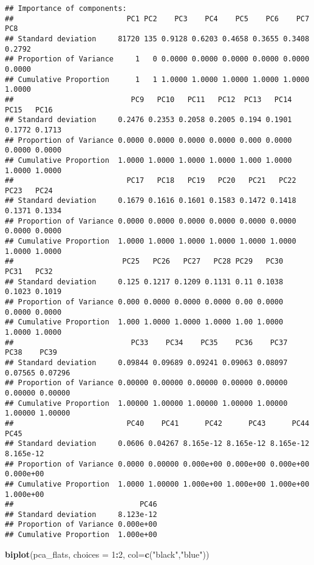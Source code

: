 \documentclass[
]{article}
\newenvironment{Shaded}{\begin{snugshade}}{\end{snugshade}}
\newcommand{\DataTypeTok}[1]{\textcolor[rgb]{0.13,0.29,0.53}{#1}}
\newcommand{\DecValTok}[1]{\textcolor[rgb]{0.00,0.00,0.81}{#1}}
\newcommand{\KeywordTok}[1]{\textcolor[rgb]{0.13,0.29,0.53}{\textbf{#1}}}
\newcommand{\NormalTok}[1]{#1}
\newcommand{\OperatorTok}[1]{\textcolor[rgb]{0.81,0.36,0.00}{\textbf{#1}}}
\newcommand{\StringTok}[1]{\textcolor[rgb]{0.31,0.60,0.02}{#1}}
\begin{document}
\begin{verbatim}
## Importance of components:
##                          PC1 PC2    PC3    PC4    PC5    PC6    PC7    PC8
## Standard deviation     81720 135 0.9128 0.6203 0.4658 0.3655 0.3408 0.2792
## Proportion of Variance     1   0 0.0000 0.0000 0.0000 0.0000 0.0000 0.0000
## Cumulative Proportion      1   1 1.0000 1.0000 1.0000 1.0000 1.0000 1.0000
##                           PC9   PC10   PC11   PC12  PC13   PC14   PC15   PC16
## Standard deviation     0.2476 0.2353 0.2058 0.2005 0.194 0.1901 0.1772 0.1713
## Proportion of Variance 0.0000 0.0000 0.0000 0.0000 0.000 0.0000 0.0000 0.0000
## Cumulative Proportion  1.0000 1.0000 1.0000 1.0000 1.000 1.0000 1.0000 1.0000
##                          PC17   PC18   PC19   PC20   PC21   PC22   PC23   PC24
## Standard deviation     0.1679 0.1616 0.1601 0.1583 0.1472 0.1418 0.1371 0.1334
## Proportion of Variance 0.0000 0.0000 0.0000 0.0000 0.0000 0.0000 0.0000 0.0000
## Cumulative Proportion  1.0000 1.0000 1.0000 1.0000 1.0000 1.0000 1.0000 1.0000
##                         PC25   PC26   PC27   PC28 PC29   PC30   PC31   PC32
## Standard deviation     0.125 0.1217 0.1209 0.1131 0.11 0.1038 0.1023 0.1019
## Proportion of Variance 0.000 0.0000 0.0000 0.0000 0.00 0.0000 0.0000 0.0000
## Cumulative Proportion  1.000 1.0000 1.0000 1.0000 1.00 1.0000 1.0000 1.0000
##                           PC33    PC34    PC35    PC36    PC37    PC38    PC39
## Standard deviation     0.09844 0.09689 0.09241 0.09063 0.08097 0.07565 0.07296
## Proportion of Variance 0.00000 0.00000 0.00000 0.00000 0.00000 0.00000 0.00000
## Cumulative Proportion  1.00000 1.00000 1.00000 1.00000 1.00000 1.00000 1.00000
##                          PC40    PC41      PC42      PC43      PC44      PC45
## Standard deviation     0.0606 0.04267 8.165e-12 8.165e-12 8.165e-12 8.165e-12
## Proportion of Variance 0.0000 0.00000 0.000e+00 0.000e+00 0.000e+00 0.000e+00
## Cumulative Proportion  1.0000 1.00000 1.000e+00 1.000e+00 1.000e+00 1.000e+00
##                             PC46
## Standard deviation     8.123e-12
## Proportion of Variance 0.000e+00
## Cumulative Proportion  1.000e+00
\end{verbatim}

\begin{Shaded}
\begin{Highlighting}[]
\KeywordTok{biplot}\NormalTok{(pca_flats, }\DataTypeTok{choices =} \DecValTok{1}\OperatorTok{:}\DecValTok{2}\NormalTok{, }\DataTypeTok{col=}\KeywordTok{c}\NormalTok{(}\StringTok{"black"}\NormalTok{,}\StringTok{"blue"}\NormalTok{))}
\end{Highlighting}
\end{Shaded}
\end{document}
